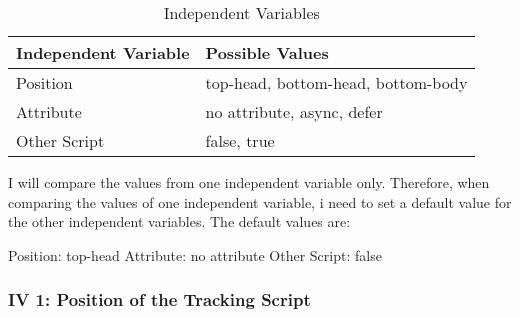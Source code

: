 \begin{table}[h]
	\small
	\centering
	\begin{tabular}{ | l | l | }
	\hline
	Independent Variable \cellcolor{lightgrey} & Possible Values \cellcolor{lightgrey} \\
	\hline
	Position & top-head, bottom-head, bottom-body \\
	Attribute & no attribute, async, defer \\
	Other Script & false, true \\
	\hline
	\end{tabular}
	\medskip
	\caption{Independent Variables}
	\label{table:independent_variables}
\end{table}

I will compare the values from one independent variable only.
Therefore, when comparing the values of one independent variable, i need to set a default value for the other independent variables.
The default values are:

Position: top-head
Attribute: no attribute
Other Script: false




\subsubsection{IV 1: Position of the Tracking Script}













